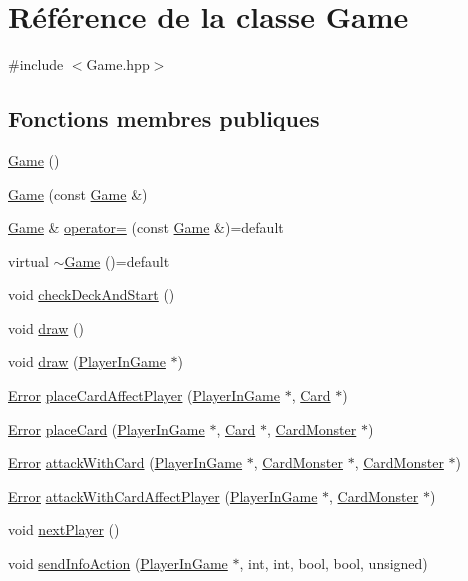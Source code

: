 \hypertarget{classGame}{}\section{Référence de la classe Game}
\label{classGame}


{\ttfamily \#include $<$Game.\+hpp$>$}

\subsection*{Fonctions membres publiques}
\begin{DoxyCompactItemize}
\item 
\hyperlink{classGame_ad59df6562a58a614fda24622d3715b65}{Game} ()
\item 
\hyperlink{classGame_aa79443880de5f26387c2a1c70c8c1aae}{Game} (const \hyperlink{classGame}{Game} \&)
\item 
\hyperlink{classGame}{Game} \& \hyperlink{classGame_a5e2d7c75effddbacf32883492a64d8d4}{operator=} (const \hyperlink{classGame}{Game} \&)=default
\item 
virtual \hyperlink{classGame_ab0556d428e8db075b405355af7e81dae}{$\sim$\+Game} ()=default
\item 
void \hyperlink{classGame_a41a8233a0473e2e3687d0380c9b2bccb}{check\+Deck\+And\+Start} ()
\item 
void \hyperlink{classGame_a6d54497ce3a66f6dd45eacfdccc8d0bd}{draw} ()
\item 
void \hyperlink{classGame_a0e5055bedff4cda4488c97e5d20ae647}{draw} (\hyperlink{classPlayerInGame}{Player\+In\+Game} $\ast$)
\item 
\hyperlink{Error_8hpp_a2c3e4bb40f36b262a5214e2da2bca9c5}{Error} \hyperlink{classGame_a2395757098b2684235751b0675e0bf1d}{place\+Card\+Affect\+Player} (\hyperlink{classPlayerInGame}{Player\+In\+Game} $\ast$, \hyperlink{classCard}{Card} $\ast$)
\item 
\hyperlink{Error_8hpp_a2c3e4bb40f36b262a5214e2da2bca9c5}{Error} \hyperlink{classGame_acc43da7befc9a1d6a5a806e1c67007f2}{place\+Card} (\hyperlink{classPlayerInGame}{Player\+In\+Game} $\ast$, \hyperlink{classCard}{Card} $\ast$, \hyperlink{classCardMonster}{Card\+Monster} $\ast$)
\item 
\hyperlink{Error_8hpp_a2c3e4bb40f36b262a5214e2da2bca9c5}{Error} \hyperlink{classGame_a579b2a86d407b6d6329c175bb17e1b85}{attack\+With\+Card} (\hyperlink{classPlayerInGame}{Player\+In\+Game} $\ast$, \hyperlink{classCardMonster}{Card\+Monster} $\ast$, \hyperlink{classCardMonster}{Card\+Monster} $\ast$)
\item 
\hyperlink{Error_8hpp_a2c3e4bb40f36b262a5214e2da2bca9c5}{Error} \hyperlink{classGame_a68812012d1e9dacc27bbbc0304000854}{attack\+With\+Card\+Affect\+Player} (\hyperlink{classPlayerInGame}{Player\+In\+Game} $\ast$, \hyperlink{classCardMonster}{Card\+Monster} $\ast$)
\item 
void \hyperlink{classGame_aa5b09732ecd16afc3cd6d3f580366237}{next\+Player} ()
\item 
void \hyperlink{classGame_a97859a60ec71242e0590fba4c9d35804}{send\+Info\+Action} (\hyperlink{classPlayerInGame}{Player\+In\+Game} $\ast$, int, int, bool, bool, unsigned)
\end{DoxyCompactItemize}
